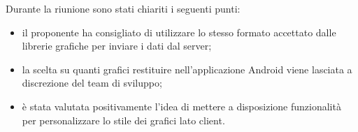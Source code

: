 Durante la riunione sono stati chiariti i seguenti punti:
\begin{itemize}
\item il proponente ha consigliato di utilizzare lo stesso formato accettato dalle librerie grafiche per inviare i dati dal server;
\item la scelta su quanti grafici restituire nell'applicazione Android viene lasciata a discrezione del team di sviluppo;
\item è stata valutata positivamente l'idea di mettere a disposizione funzionalità per personalizzare lo stile dei grafici lato client.
\end{itemize}